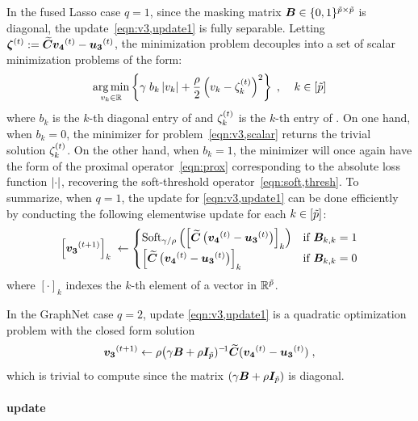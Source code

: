 In the fused Lasso case $q=1$, since the masking matrix ${\bm{B}}\in\{0,1\}^{{\tilde{p}}\times{\ensuremath{\tilde{p}}}}$ is diagonal, the update~\eqref{eqn:v3,update1} is fully separable.
Letting $\bm{\zeta}^{(t)}:={\bm{\widetilde{C}}}{\bm{v_4}}^{(t)}-{\bm{u_3}}^{(t)}$, the minimization problem decouples into a set of scalar minimization problems of the form:
\begin{equation}
	\operatorname*{arg\,min}_{v_k\in\mathbb{R}}\left\{ \gamma\; b_k\left| v_k \right| + 
			\frac{\rho}{2} \left(v_k-\zeta_k^{(t)} \right)^2  
		\right\} \;,\;\;\;\; k\in[{\tilde{p}}]
	\label{eqn:v3,scalar}
\end{equation}
where $b_k$ is the $k$-th diagonal entry of \B and $\zeta_k^{(t)}$ is the $k$-th entry of \sloppy{${\Bzeta\iter\in\reals^\ptil}$}.
On one hand, when $b_k=0$, the minimizer for problem~\eqref{eqn:v3,scalar} returns the trivial solution $\zeta_k^{(t)}$.
On the other hand, when $b_k=1$, the minimizer will once again have the form of the proximal operator~\eqref{eqn:prox} corresponding to the absolute loss function $\left| \cdot \right|$, recovering the soft-threshold operator~\eqref{eqn:soft,thresh}.
To summarize, when $q=1$, the update for \vc \eqref{eqn:v3,update1} can be done efficiently by conducting the following elementwise update for each $k\in[{\tilde{p}}]$:
\begin{equation}
	\left[{\bm{v_3}}^{(t+1)}\right]_k \;\leftarrow
	\begin{cases}
		\mathrm{Soft}_{\gamma/\rho}\left(\left[{\bm{\widetilde{C}}}\left({\bm{v_4}}^{(t)}-{\bm{u_3}}^{(t)}\right)\right]_k\right) & \text{if } {\ensuremath{\bm{B}}}_{k,k}=1 \\
		\left[{\bm{\widetilde{C}}}\left({\bm{v_4}}^{(t)}-{\bm{u_3}}^{(t)}\right)\right]_k & \text{if } {\ensuremath{\bm{B}}}_{k,k}=0
	\end{cases}	
	\label{eqn:v3,update,flasso}
\end{equation}
where $\left[\cdot\right]_k$ indexes the $k$-th element of a vector in $\mathbb{R}^{\tilde{p}}$.

In the GraphNet case $q=2$, update \eqref{eqn:v3,update1} is a quadratic optimization problem with the closed form solution
\begin{equation}
	{\ensuremath{\bm{v_3}}}^{(t+1)} \leftarrow \rho\big(\gamma{\ensuremath{\bm{B}}}+\rho{\ensuremath{\bm{I}}}_{\tilde{p}})^{-\!1}{\bm{\widetilde{C}}}({\bm{v_4}}^{(t)}-{\bm{u_3}}^{(t)}) \;,
	\label{eqn:v3,update,gnet}
\end{equation}
which is trivial to compute since the matrix $(\gamma{\ensuremath{\bm{B}}}+\rho{\ensuremath{\bm{I}}}_{\tilde{p}})$ is diagonal.

\paragraph{\vd update}

